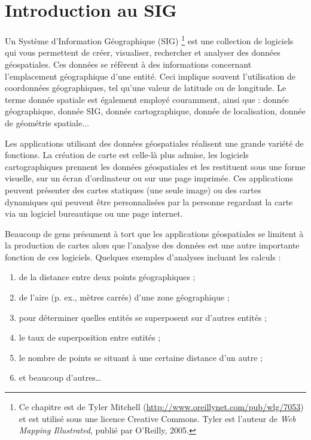 \pagestyle{scrheadings}
\chapter{Introduction au SIG}\label{label_intro} 

Un Système d'Information Géographique (SIG) \parencite{mitchel05}\footnote{Ce chapitre est de Tyler Mitchell (\url{http://www.oreillynet.com/pub/wlg/7053}) et est utilisé sous une licence Creative Commons. Tyler est l'auteur de \textit{Web Mapping Illustrated}, publié par O'Reilly, 2005.} est une collection de logiciels qui vous permettent de créer, visualiser, rechercher et analyser des données géospatiales. Ces données se réfèrent à des informations concernant l'emplacement géographique d'une entité. Ceci implique souvent l'utilisation de coordonnées géographiques, tel qu'une valeur de latitude ou de longitude. Le terme donnée spatiale est également employé couramment, ainsi que : donnée géographique, donnée SIG, donnée cartographique, donnée de localisation, donnée de géométrie spatiale...

Les applications utilisant des données géospatiales réalisent une grande variété de fonctions. La création de carte est celle-là plus admise, les logiciels cartographiques prennent les données géospatiales et les restituent sous une forme visuelle, sur un écran d'ordinateur ou sur une page imprimée.
Ces applications peuvent présenter des cartes statiques (une seule image) ou des cartes dynamiques qui peuvent être personnalisées par la personne regardant la carte via un logiciel bureautique ou une page internet.

Beaucoup de gens présument à tort que les applications géospatiales se limitent à la production de cartes alors que l'analyse des données est une autre importante fonction de ces logiciels. Quelques exemples d'analyses incluant les calculs : 

\begin{enumerate} 
\item de la distance entre deux points géographiques  ;
\item de l'aire (p. ex., mètres carrés) d'une zone géographique ;
\item pour déterminer quelles entités se superposent sur d'autres entités ;
\item le taux de superposition entre entités ;
\item le nombre de points se situant à une certaine distance d'un autre ;
\item et beaucoup d'autres\dots
\end{enumerate} 

